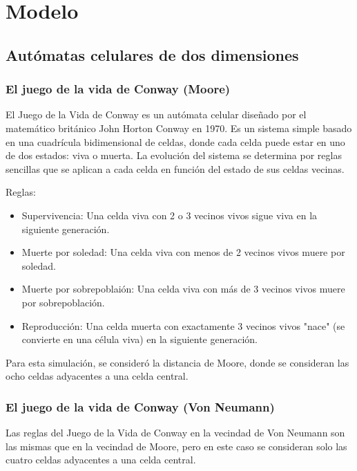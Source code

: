 \section{Modelo}
\label{sec:modelo}

\subsection{Autómatas celulares de dos dimensiones}
\label{subsec:2d}

\subsubsection{El juego de la vida de Conway (Moore)}

El Juego de la Vida de Conway es un autómata celular diseñado por el matemático británico John Horton Conway en 1970.
Es un sistema simple basado en una cuadrícula bidimensional de celdas, donde cada celda puede estar en uno de dos estados: viva o muerta.
La evolución del sistema se determina por reglas sencillas que se aplican a cada celda en función del estado de sus celdas vecinas.

Reglas:
\begin{itemize}
    \item Supervivencia: Una celda viva con 2 o 3 vecinos vivos sigue viva en la siguiente generación.

    \item Muerte por soledad: Una celda viva con menos de 2 vecinos vivos muere por soledad.

    \item Muerte por sobrepoblaión: Una celda viva con más de 3 vecinos vivos muere por sobrepoblación.

    \item Reproducción: Una celda muerta con exactamente 3 vecinos vivos "nace" (se convierte en una célula viva) en la siguiente generación.
\end{itemize}

Para esta simulación, se consideró la distancia de Moore, donde se consideran las ocho celdas adyacentes a una celda central.

\subsubsection{El juego de la vida de Conway (Von Neumann)}

Las reglas del Juego de la Vida de Conway en la vecindad de Von Neumann son las mismas que en la vecindad de Moore, pero en este caso se consideran solo las cuatro celdas adyacentes a una celda central.


